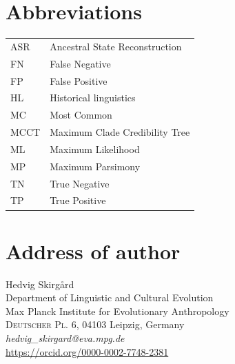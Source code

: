 \documentclass[12pt,letterpaper]{article}
\begin{document}
\section*{Abbreviations}
\begin{tabular}{p{3cm} p{10cm} }
ASR & Ancestral State Reconstruction\\
FN & False Negative \\
FP & False Positive \\
HL & Historical linguistics\\
MC & Most Common \\
MCCT & Maximum Clade Credibility Tree \\
ML & Maximum Likelihood \\
MP &Maximum Parsimony \\
TN & True Negative\\
TP & True Positive \\
\end{tabular}




\newpage
\section*{Address of author}
Hedvig Skirgård\\
Department of Linguistic and Cultural Evolution\\
Max Planck Institute for Evolutionary Anthropology\\
\textsc{Deutscher Pl. 6, 04103}
Leipzig, Germany\\
\textit{hedvig\_{}skirgard@eva.mpg.de}\\
\url{https://orcid.org/0000-0002-7748-2381}


\newpage
\end{document}

